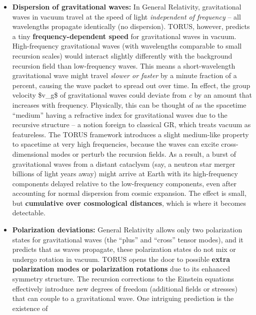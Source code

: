 \documentclass[
]{article}
\begin{document}
\begin{itemize}
\item
  \textbf{Dispersion of gravitational waves:} In General Relativity,
  gravitational waves in vacuum travel at the speed of light
  \emph{independent of frequency} -- all wavelengths propagate
  identically (no dispersion). TORUS, however, predicts a tiny
  \textbf{frequency-dependent speed} for gravitational waves in
  vacuum\hspace{0pt}. High-frequency gravitational waves (with
  wavelengths comparable to small recursion scales) would interact
  slightly differently with the background recursion field than
  low-frequency waves. This means a short-wavelength gravitational wave
  might travel \emph{slower or faster} by a minute fraction of a
  percent, causing the wave packet to spread out over time. In effect,
  the group velocity \$v\_g\$ of gravitational waves could deviate from
  \emph{c} by an amount that increases with frequency\hspace{0pt}.
  Physically, this can be thought of as the spacetime ``medium'' having
  a refractive index for gravitational waves due to the recursive
  structure -- a notion foreign to classical GR, which treats vacuum as
  featureless. The TORUS framework introduces a slight medium-like
  property to spacetime at very high frequencies, because the waves can
  excite cross-dimensional modes or perturb the recursion fields. As a
  result, a burst of gravitational waves from a distant cataclysm (say,
  a neutron star merger billions of light years away) might arrive at
  Earth with its high-frequency components delayed relative to the
  low-frequency components, even after accounting for normal dispersion
  from cosmic expansion. The effect is small, but \textbf{cumulative
  over cosmological distances}, which is where it becomes
  detectable\hspace{0pt}.
\item
  \textbf{Polarization deviations:} General Relativity allows only two
  polarization states for gravitational waves (the ``plus'' and
  ``cross'' tensor modes), and it predicts that as waves propagate,
  these polarization states do not mix or undergo rotation in vacuum.
  TORUS opens the door to possible \textbf{extra polarization modes or
  polarization rotations} due to its enhanced symmetry structure. The
  recursion corrections to the Einstein equations effectively introduce
  new degrees of freedom (additional fields or stresses) that can couple
  to a gravitational wave. One intriguing prediction is the existence of

\end{itemize}
\end{document}
